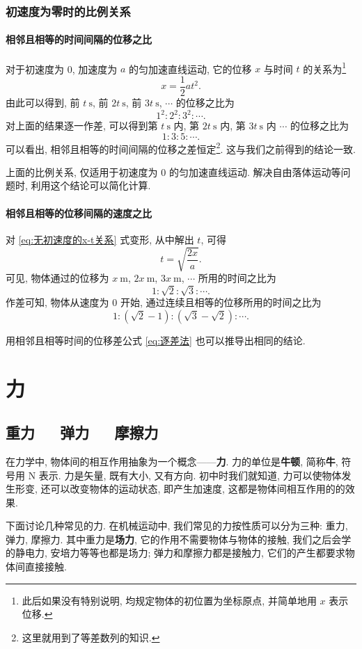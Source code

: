 \documentclass[UTF8,openany,fontset=fandol]{ctexbook}
\theoremstyle{chinesetextbook}
\newcommand{\bre}{\ \ \ }
\newcommand{\unit}[1]{\ \mathrm{#1}}
\begin{document}
\subsection{初速度为零时的比例关系}
\subsubsection{相邻且相等的时间间隔的位移之比}
对于初速度为 0, 加速度为 $a$ 的匀加速直线运动, 它的位移 $x$ 与时间 $t$ 的关系为\footnote{此后如果没有特别说明, 均规定物体的初位置为坐标原点, 并简单地用 $x$ 表示位移.}
\begin{equation}\label{eq:无初速度的x-t关系}
x=\frac12 at^2.
\end{equation}
由此可以得到, 前 $t\unit{s}$, 前 $2t\unit{s}$, 前 $3t\unit{s}$, $\cdots$ 的位移之比为
\[
1^2:2^2:3^2:\cdots.
\]
对上面的结果逐一作差, 可以得到第 $t\unit{s}$ 内, 第 $2t\unit{s}$ 内, 第 $3t\unit{s}$ 内 $\cdots$ 的位移之比为
\[
1:3:5:\cdots.
\]
可以看出, 相邻且相等的时间间隔的位移之差恒定\footnote{这里就用到了等差数列的知识.}. 这与我们之前得到的结论一致.

上面的比例关系, 仅适用于初速度为 0 的匀加速直线运动. 解决自由落体运动等问题时, 利用这个结论可以简化计算.
\subsubsection{相邻且相等的位移间隔的速度之比}
对 \eqref{eq:无初速度的x-t关系} 式变形, 从中解出 $t$, 可得
\[
t=\sqrt{\frac{2x}{a}}.
\]
可见, 物体通过的位移为 $x\unit{m}$, $2x\unit{m}$, $3x\unit{m}$, $\cdots$ 所用的时间之比为
\[
1:\sqrt{2}:\sqrt{3}:\cdots.
\]
作差可知, 物体从速度为 0 开始, 通过连续且相等的位移所用的时间之比为
\[
1:(\sqrt{2}-1):(\sqrt{3}-\sqrt{2}):\cdots.
\]

用相邻且相等时间的位移差公式 \eqref{eq:逐差法} 也可以推导出相同的结论.
\chapter{力}
\section{重力\bre 弹力\bre 摩擦力}
在力学中, 物体间的相互作用抽象为一个概念——\textbf{力}. 力的单位是\textbf{牛顿}, 简称\textbf{牛}, 符号用 N 表示. 力是矢量, 既有大小, 又有方向. 初中时我们就知道, 力可以使物体发生形变, 还可以改变物体的运动状态, 即产生加速度, 这都是物体间相互作用的的效果.

下面讨论几种常见的力. 在机械运动中, 我们常见的力按性质可以分为三种: 重力, 弹力, 摩擦力. 其中重力是\textbf{场力}, 它的作用不需要物体与物体的接触, 我们之后会学的静电力, 安培力等等也都是场力; 弹力和摩擦力都是接触力, 它们的产生都要求物体间直接接触.
\end{document}
